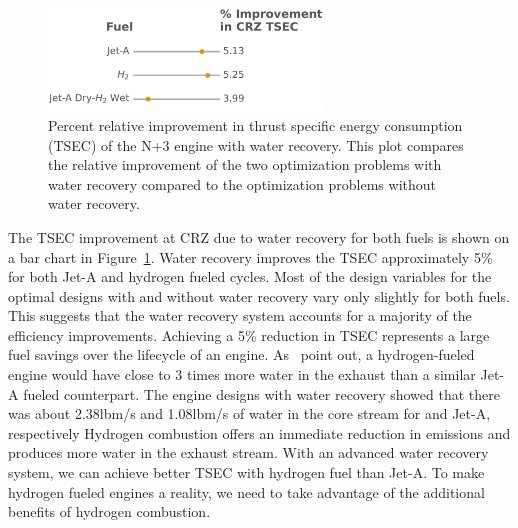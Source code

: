 \documentclass[conf]{new-aiaa}
\begin{document}
\begin{figure}[hbt!]
  \centering
  \includegraphics[width=0.65\textwidth]{bar_chart.pdf}
  \caption{Percent relative improvement in thrust specific energy consumption (TSEC) of the N+3 engine with water recovery.
    This plot compares the relative improvement of the two optimization problems with water recovery compared to the optimization problems without water recovery.}
  \label{fig:barchart}
\end{figure}

The TSEC improvement at CRZ due to water recovery for both fuels is shown on a bar chart in Figure~\ref{fig:barchart}.
Water recovery improves the TSEC approximately 5\% for both Jet-A and hydrogen fueled cycles.
Most of the design variables for the optimal designs with and without water recovery vary only slightly for both fuels.
This suggests that the water recovery system accounts for a majority of the efficiency improvements.
Achieving a 5\% reduction in TSEC represents a large fuel savings over the lifecycle of an engine.
As~\citeauthor{Strom2002} point out, a hydrogen-fueled engine would have close to 3 times more water in the exhaust than a similar Jet-A fueled counterpart.
The engine designs with water recovery showed that there was about 2.38\si{lbm/s} and 1.08\si{lbm/s} of water in the core stream for  and Jet-A, respectively
Hydrogen combustion offers an immediate reduction in emissions and produces more water in the exhaust stream.
With an advanced water recovery system, we can achieve better TSEC with hydrogen fuel than Jet-A.
To make hydrogen fueled engines a reality, we need to take advantage of the additional benefits of hydrogen combustion.
\end{document}
